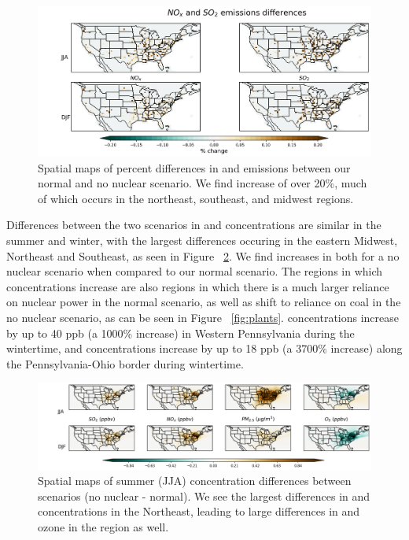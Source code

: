 \documentclass[12]{article}
\begin{document}
\begin{figure}
    \centering
    \includegraphics[scale=0.4]{ego_nonuclear_project/Figures/summer_nox_so2_emissions.png}
    \caption{Spatial maps of percent differences in  and  emissions between our normal and no nuclear scenario. We find increase of over 20\%, much of which occurs in the northeast, southeast, and midwest regions.} 
    \label{fig:emissions_nonuc}
\end{figure}

Differences between the two scenarios in  and  concentrations are similar in the summer and winter, with the largest differences occuring in the eastern Midwest, Northeast and Southeast, as seen in Figure ~\ref{fig:summer_winter_dif}. We find increases in both for a no nuclear scenario when compared to our normal scenario. The regions in which concentrations increase are also regions in which there is a much larger reliance on nuclear power in the normal scenario, as well as shift to reliance on coal in the no nuclear scenario, as can be seen in Figure ~\ref{fig:plants}.  concentrations increase by up to 40 ppb (a 1000\% increase) in Western Pennsylvania during the wintertime, and  concentrations increase by up to 18 ppb (a 3700\% increase) along the Pennsylvania-Ohio border during wintertime. 
\begin{figure}
    \centering
    \includegraphics[scale=0.5]{ego_nonuclear_project/Figures/summer_winter_national_dif.png}
    \caption{Spatial maps of summer (JJA) concentration differences between scenarios (no nuclear - normal). We see the largest differences in  and  concentrations in the Northeast, leading to large differences in  and ozone in the region as well.} 
    \label{fig:summer_winter_dif}
\end{figure}
\end{document}
